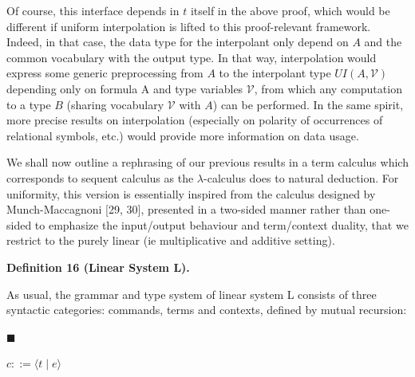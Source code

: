 \documentclass[10pt,a4paper]{article}
\begin{document}
 
 
Of course, this interface depends in $t$ itself in the above proof, which would be different if uniform interpolation is lifted to this proof-relevant framework. Indeed, in that case, the data type for the interpolant only depend on $A$ and the common vocabulary with the output type. In that way, interpolation would express some generic preprocessing from $A$ to the interpolant type $UI(A,\mathcal{V})$ depending only on formula A and type variables $\mathcal{V}$, from which any computation to a type $B$ (sharing vocabulary $\mathcal{V}$ with $A$) can be performed. In the same spirit, more precise results on interpolation (especially on polarity of occurrences of relational symbols, etc.) would provide more information on data usage.\par
 
 
  
 
 
We shall now outline a rephrasing of our previous results in a term calculus which corresponds to sequent calculus as the $\lambda$-calculus does to natural deduction. For uniformity, this version is essentially inspired from the calculus designed by Munch-Maccagnoni [29, 30], presented in a two-sided manner rather than one-sided to emphasize the input/output behaviour and term/context duality, that we restrict to the purely linear (ie multiplicative and additive setting).\par
 
 
 
\par\medskip\noindent\textbf{Definition 16 (Linear System L).}\par
 
 
As usual, the grammar and type system of linear system L consists of three syntactic categories: commands, terms and contexts, defined by mutual recursion:\par
  
\par\noindent  $\blacksquare$ 
 
$c::=\langle t\mid e\rangle$\par
 
 
\end{document}
